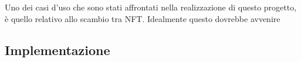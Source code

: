 Uno dei casi d'uso che sono stati affrontati nella realizzazione di questo progetto, è quello relativo allo scambio tra NFT. Idealmente questo dovrebbe avvenire  

\subsection{Implementazione}








